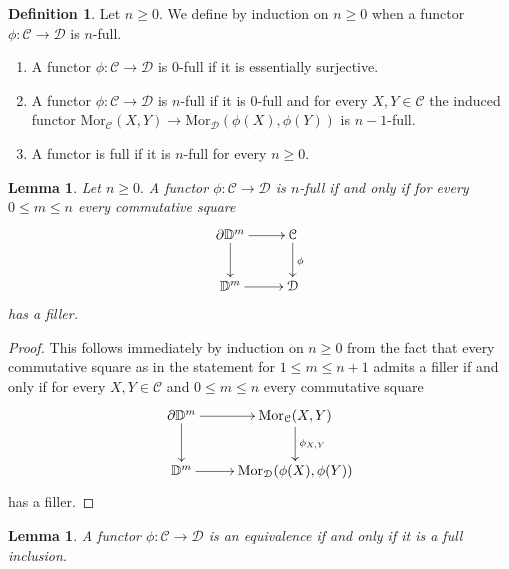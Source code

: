 \documentclass[10pt,oneside]{article}
\numberwithin{equation}{section} %
\numberwithin{figure}{section} %
\theoremstyle{plain}
\newtheorem{lemma}[theorem]{Lemma}
\theoremstyle{definition}
\newtheorem{definition}[theorem]{Definition}
\newcommand{\bD}{{\mathbb D}}
\newcommand{\mC}{{\mathcal C}}
\newcommand{\mD}{{\mathcal D}}
\newcommand{\Mor}{{\mathrm{Mor}}}
\begin{document}
\begin{definition}
Let $n \geq 0.$ We define by induction on $n \geq 0$ when a functor
$\phi:\mC \to \mD$ is $n$-full.

\begin{enumerate}[\normalfont(1)]\setlength{\itemsep}{-2pt}
\item A functor $\phi:\mC \to \mD$ is 0-full if it is essentially surjective.

\item A functor $\phi:\mC \to \mD$ is $n$-full if it is 0-full and for every $X,Y\in \mC$
the induced functor $\Mor_{\mC}(X,Y) \to \Mor_\mD(\phi(X),\phi(Y))$
is $n-1$-full.

\item A functor is full if it is $n$-full for every $n \geq 0.$

\end{enumerate}  

\end{definition}

\begin{lemma}Let $n \geq 0.$ A functor $\phi:\mC \to \mD$ is $n$-full if and only if for every $0 \leq m \leq n$ every commutative square
$$\begin{xy}
\xymatrix{
\partial\bD^m \ar[d]^{} \ar[r]
& \mC \ar[d]^\phi
\\ 
\bD^m \ar[r]& \mD}
\end{xy}$$
has a filler.
    
\end{lemma}

\begin{proof}

This follows immediately by induction on $n \geq 0$ from the fact that
every commutative square as in the statement for $1 \leq m \leq n+1$
admits a filler if and only if for every $X,Y \in \mC$ and $0 \leq m \leq n$ every commutative square
$$\begin{xy}
\xymatrix{
\partial\bD^m \ar[d]^{} \ar[r]
& \Mor_\mC(X,Y) \ar[d]^{\phi_{X,Y}}
\\ 
\bD^m \ar[r]& \Mor_\mD(\phi(X),\phi(Y))}
\end{xy}$$
has a filler.
\end{proof}

\begin{lemma}\label{eqil} 
A functor $\phi :\mC \to \mD$ is an equivalence if and only if
it is a full inclusion.   
\end{lemma}
\end{document}
